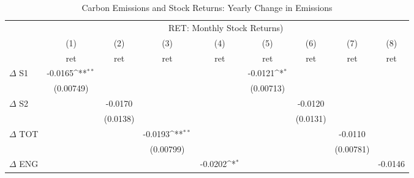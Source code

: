 \begin{table}[htbp]\centering
\def\sym#1{\ifmmode^{#1}\else\(^{#1}\)\fi}
\caption{Carbon Emissions and Stock Returns: Yearly Change in Emissions}
\begin{tabular}{l*{8}{c}}
\hline\hline
                    &\multicolumn{8}{c}{RET: Monthly Stock Returns) }                                                                                                                               \\\cmidrule(lr){2-9}
                    &\multicolumn{1}{c}{(1)}&\multicolumn{1}{c}{(2)}&\multicolumn{1}{c}{(3)}&\multicolumn{1}{c}{(4)}&\multicolumn{1}{c}{(5)}&\multicolumn{1}{c}{(6)}&\multicolumn{1}{c}{(7)}&\multicolumn{1}{c}{(8)}\\
                    &\multicolumn{1}{c}{ret}&\multicolumn{1}{c}{ret}&\multicolumn{1}{c}{ret}&\multicolumn{1}{c}{ret}&\multicolumn{1}{c}{ret}&\multicolumn{1}{c}{ret}&\multicolumn{1}{c}{ret}&\multicolumn{1}{c}{ret}\\
\hline
$\Delta$ S1         &     -0.0165\sym{**} &                     &                     &                     &     -0.0121\sym{*}  &                     &                     &                     \\
                    &   (0.00749)         &                     &                     &                     &   (0.00713)         &                     &                     &                     \\
$\Delta$ S2         &                     &     -0.0170         &                     &                     &                     &     -0.0120         &                     &                     \\
                    &                     &    (0.0138)         &                     &                     &                     &    (0.0131)         &                     &                     \\
$\Delta$ TOT        &                     &                     &     -0.0193\sym{**} &                     &                     &                     &     -0.0110         &                     \\
                    &                     &                     &   (0.00799)         &                     &                     &                     &   (0.00781)         &                     \\
$\Delta$ ENG        &                     &                     &                     &     -0.0202\sym{*}  &                     &                     &                     &     -0.0146         \\

\end{tabular}
\end{table}
